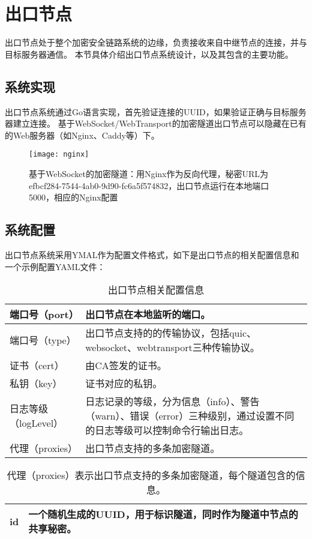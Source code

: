 \section{出口节点}
出口节点处于整个加密安全链路系统的边缘，负责接收来自中继节点的连接，并与目标服务器通信。
本节具体介绍出口节点系统设计，以及其包含的主要功能。

\subsection{系统实现}
出口节点系统通过Go语言实现，首先验证连接的UUID，如果验证正确与目标服务器建立连接。
基于WebSocket/WebTransport的加密隧道出口节点可以隐藏在已有的Web服务器（如Nginx、Caddy等）下。

\begin{figure}[H]
  \centering
  \texttt{[image: nginx]}
  \caption{基于WebSocket的加密隧道：用Nginx作为反向代理，秘密URL为efbcf284-7544-4ab0-9d90-fc6a5f574832，出口节点运行在本地端口5000，相应的Nginx配置}
\end{figure}

\subsection{系统配置}
出口节点系统采用YMAL作为配置文件格式，如下是出口节点的相关配置信息和一个示例配置YAML文件：
\begin{table}[H]
  \begin{tabular}{| m{10em} | m{22em} |}
  \hline
  端口号（port） & 出口节点在本地监听的端口。  \\ \hline
  端口号（type） & 出口节点支持的的传输协议，包括quic、websocket、webtransport三种传输协议。  \\ \hline
  证书（cert） & 由CA签发的证书。  \\ \hline
  私钥（key） & 证书对应的私钥。  \\ \hline
  日志等级（logLevel）  & 日志记录的等级，分为信息（info）、警告（warn）、错误（error）三种级别，通过设置不同的日志等级可以控制命令行输出日志。 \\ \hline       
  代理（proxies）  & 出口节点支持的多条加密隧道。 \\ \hline                
  \end{tabular}
  \caption{出口节点相关配置信息}
\end{table}

\begin{table}[H]
  \begin{tabular}{| m{10em} | m{22em} |}
  \hline
  id & 一个随机生成的UUID，用于标识隧道，同时作为隧道中节点的共享秘密。  \\ \hline                  
  \end{tabular}
  \caption{代理（proxies）表示出口节点支持的多条加密隧道，每个隧道包含的信息。}
\end{table}

